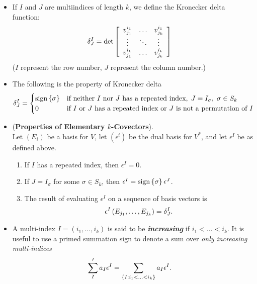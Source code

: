 \documentclass[11pt]{article}
\begin{document}
\begin{itemize}
\item \begin{definition}
If $I$ and $J$ are multiindices of length $k$, we define the Kronecker delta function:
\begin{align*}
\delta_{J}^{I} &= \det{\left[ \begin{array}{ccc}
v_{j_1}^{i_1} & \ldots & v_{j_k}^{i_1}\\
\vdots & \ddots & \vdots \\
v_{j_1}^{i_k} & \ldots & v_{j_k}^{i_k}
\end{array}  \right]}
\end{align*} ($I$ represent the row number, $J$ represent the column number.)
\end{definition}

\item \begin{remark} The following is the property of Kronecker delta
\begin{equation*}
  \delta_{J}^{I} =
    \begin{cases}
      \text{sign}\left\{\sigma\right\} &\text{if neither $I$ nor $J$ has a repeated index},\; J = I_{\sigma}, \; \sigma \in S_k\\
      0 & \text{if $I$ or $J$ has a repeated index or $J$ is not a permutation of $I$}
    \end{cases}       
\end{equation*}
\end{remark}

\item \begin{lemma} (\textbf{Properties of Elementary $k$-Covectors}). \\
Let $(E_i)$ be a basis for $V$, let $(\epsilon^i)$ be the dual basis for $V^{*}$, and let $\epsilon^I$ be as defined above.
\begin{enumerate}
\item If $I$ has a repeated index, then $\epsilon^I = 0$.
\item If $J = I_{\sigma}$ for some $\sigma \in S_k$, then $\epsilon^I = \text{sign}\left\{\sigma\right\}\epsilon^{J}$.
\item The result of evaluating $\epsilon^I$ on a sequence of basis vectors is
\begin{align*}
\epsilon^I\left(E_{j_1},\ldots, E_{j_{k}}\right) = \delta_{J}^{I}.
\end{align*}
\end{enumerate}
\end{lemma}

\item \begin{definition}
A multi-index $I=(i_1,\ldots, i_k)$ is said to be \emph{\textbf{increasing}} if $i_1 < \ldots < i_k$. It is useful
to use a primed summation sign to denote a sum over \emph{only increasing multi-indices}
\begin{align*}
\sum_{I}'a_{I}\epsilon^{I} &= \sum_{\left\{I: i_1 < \ldots < i_k\right\}}a_{I}\epsilon^{I}.
\end{align*}
\end{definition}


\end{itemize}
\end{document}
